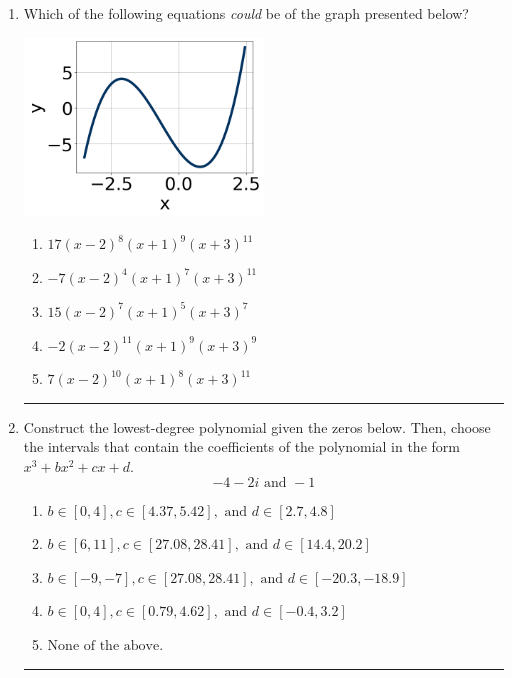 \documentclass[14pt]{extbook}
\newcommand{\litem}[1]{\item#1\hspace*{-1cm}\rule{\textwidth}{0.4pt}}
\begin{document}
\begin{enumerate}
{\begin{enumerate}[label=\Alph*.]
\end{enumerate} }
\litem{
Which of the following equations \textit{could} be of the graph presented below?
\begin{center}
    \includegraphics[width=0.5\textwidth]{../Figures/polyGraphToFunctionCopyA.png}
\end{center}
\begin{enumerate}[label=\Alph*.]
\item \( 17(x - 2)^{8} (x + 1)^{9} (x + 3)^{11} \)
\item \( -7(x - 2)^{4} (x + 1)^{7} (x + 3)^{11} \)
\item \( 15(x - 2)^{7} (x + 1)^{5} (x + 3)^{7} \)
\item \( -2(x - 2)^{11} (x + 1)^{9} (x + 3)^{9} \)
\item \( 7(x - 2)^{10} (x + 1)^{8} (x + 3)^{11} \)

\end{enumerate} }
\litem{
Construct the lowest-degree polynomial given the zeros below. Then, choose the intervals that contain the coefficients of the polynomial in the form $x^3+bx^2+cx+d$.\[ -4 - 2 i \text{ and } -1 \]\begin{enumerate}[label=\Alph*.]
\item \( b \in [0, 4], c \in [4.37, 5.42], \text{ and } d \in [2.7, 4.8] \)
\item \( b \in [6, 11], c \in [27.08, 28.41], \text{ and } d \in [14.4, 20.2] \)
\item \( b \in [-9, -7], c \in [27.08, 28.41], \text{ and } d \in [-20.3, -18.9] \)
\item \( b \in [0, 4], c \in [0.79, 4.62], \text{ and } d \in [-0.4, 3.2] \)
\item \( \text{None of the above.} \)


\end{enumerate}}
\end{enumerate}
\end{document}
